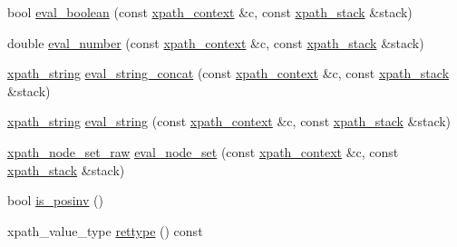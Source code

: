\begin{CompactItemize}
\item 
bool \hyperlink{classxpath__ast__node_b7f965a92023bc2704b8e6fd9f3d7c14}{eval\_\-boolean} (const \hyperlink{structxpath__context}{xpath\_\-context} \&c, const \hyperlink{structxpath__stack}{xpath\_\-stack} \&stack)
\item 
double \hyperlink{classxpath__ast__node_92dd7048e28d486bc7f382d1fc6f1de6}{eval\_\-number} (const \hyperlink{structxpath__context}{xpath\_\-context} \&c, const \hyperlink{structxpath__stack}{xpath\_\-stack} \&stack)
\item 
\hyperlink{classxpath__string}{xpath\_\-string} \hyperlink{classxpath__ast__node_af931a091af0fb91c25e90b205363b4e}{eval\_\-string\_\-concat} (const \hyperlink{structxpath__context}{xpath\_\-context} \&c, const \hyperlink{structxpath__stack}{xpath\_\-stack} \&stack)
\item 
\hyperlink{classxpath__string}{xpath\_\-string} \hyperlink{classxpath__ast__node_6b675237a590548b68d0e0b97518b6df}{eval\_\-string} (const \hyperlink{structxpath__context}{xpath\_\-context} \&c, const \hyperlink{structxpath__stack}{xpath\_\-stack} \&stack)
\item 
\hyperlink{classxpath__node__set__raw}{xpath\_\-node\_\-set\_\-raw} \hyperlink{classxpath__ast__node_30d98ec97e3129e82ac9ec3f2a759855}{eval\_\-node\_\-set} (const \hyperlink{structxpath__context}{xpath\_\-context} \&c, const \hyperlink{structxpath__stack}{xpath\_\-stack} \&stack)
\item 
bool \hyperlink{classxpath__ast__node_9253f88832441a357ea65639c73a34be}{is\_\-posinv} ()
\item 
xpath\_\-value\_\-type \hyperlink{classxpath__ast__node_2c3598521141ed4b763fe6c4f852234f}{rettype} () const 
\end{CompactItemize}
